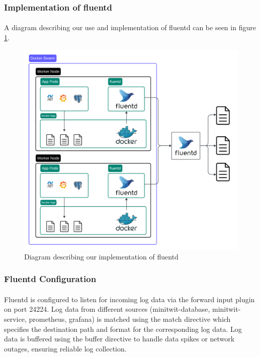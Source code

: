 \subsubsection{Implementation of fluentd}
\paragraph{} A diagram describing our use and implementation of fluentd can be seen in figure \ref{fig:logging2}.
\begin{figure}[h]
	\centering
	\includegraphics[width=1\textwidth]{Logging2.png}
	\caption{Diagram describing our implementation of fluentd}
	\label{fig:logging2}
\end{figure}

\subsubsection*{Fluentd Configuration}
\paragraph{} Fluentd is configured to listen for incoming log data via the forward input plugin on port 24224. Log data from different sources  (minitwit-database, minitwit-service, prometheus, grafana) is matched using the match directive which specifies the destination path and format for the corresponding log data. Log data is buffered using the buffer directive to handle data spikes or network outages, ensuring reliable log collection.

